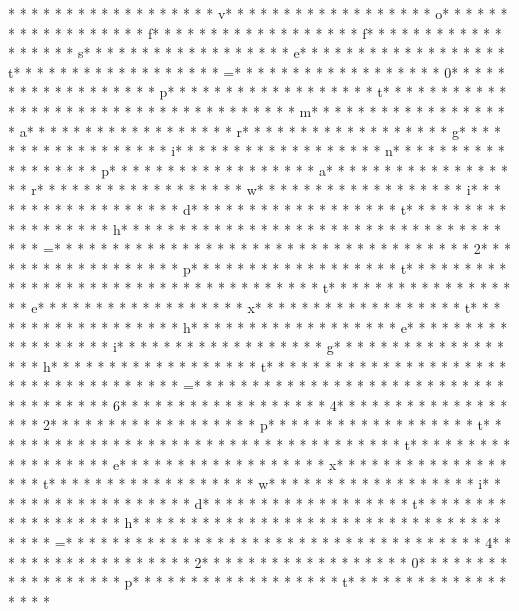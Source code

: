 * * *  * * *  * * *  *  * * *  *  * * *  * v* * *  * * *  * * *  *  * * *  *  * * *  * o* * *  * * *  * * *  *  * * *  *  * * *  * f* * *  * * *  * * *  *  * * *  *  * * *  * f* * *  * * *  * * *  *  * * *  *  * * *  * s* * *  * * *  * * *  *  * * *  *  * * *  * e* * *  * * *  * * *  *  * * *  *  * * *  * t* * *  * * *  * * *  *  * * *  *  * * *  * =* * *  * * *  * * *  *  * * *  *  * * *  * 0* * *  * * *  * * *  *  * * *  *  * * *  * p* * *  * * *  * * *  *  * * *  *  * * *  * t* * *  * * *  * * *  *  * * *  *  * * *  * 
* * *  * * *  * * *  *  * * *  *  * * *  * m* * *  * * *  * * *  *  * * *  *  * * *  * a* * *  * * *  * * *  *  * * *  *  * * *  * r* * *  * * *  * * *  *  * * *  *  * * *  * g* * *  * * *  * * *  *  * * *  *  * * *  * i* * *  * * *  * * *  *  * * *  *  * * *  * n* * *  * * *  * * *  *  * * *  *  * * *  * p* * *  * * *  * * *  *  * * *  *  * * *  * a* * *  * * *  * * *  *  * * *  *  * * *  * r* * *  * * *  * * *  *  * * *  *  * * *  * w* * *  * * *  * * *  *  * * *  *  * * *  * i* * *  * * *  * * *  *  * * *  *  * * *  * d* * *  * * *  * * *  *  * * *  *  * * *  * t* * *  * * *  * * *  *  * * *  *  * * *  * h* * *  * * *  * * *  *  * * *  *  * * *  *  * * *  * * *  * * *  *  * * *  *  * * *  * =* * *  * * *  * * *  *  * * *  *  * * *  *  * * *  * * *  * * *  *  * * *  *  * * *  * 2* * *  * * *  * * *  *  * * *  *  * * *  * p* * *  * * *  * * *  *  * * *  *  * * *  * t* * *  * * *  * * *  *  * * *  *  * * *  * 
* * *  * * *  * * *  *  * * *  *  * * *  * t* * *  * * *  * * *  *  * * *  *  * * *  * e* * *  * * *  * * *  *  * * *  *  * * *  * x* * *  * * *  * * *  *  * * *  *  * * *  * t* * *  * * *  * * *  *  * * *  *  * * *  * h* * *  * * *  * * *  *  * * *  *  * * *  * e* * *  * * *  * * *  *  * * *  *  * * *  * i* * *  * * *  * * *  *  * * *  *  * * *  * g* * *  * * *  * * *  *  * * *  *  * * *  * h* * *  * * *  * * *  *  * * *  *  * * *  * t* * *  * * *  * * *  *  * * *  *  * * *  *  * * *  * * *  * * *  *  * * *  *  * * *  * =* * *  * * *  * * *  *  * * *  *  * * *  *  * * *  * * *  * * *  *  * * *  *  * * *  * 6* * *  * * *  * * *  *  * * *  *  * * *  * 4* * *  * * *  * * *  *  * * *  *  * * *  * 2* * *  * * *  * * *  *  * * *  *  * * *  * p* * *  * * *  * * *  *  * * *  *  * * *  * t* * *  * * *  * * *  *  * * *  *  * * *  * 
* * *  * * *  * * *  *  * * *  *  * * *  * t* * *  * * *  * * *  *  * * *  *  * * *  * e* * *  * * *  * * *  *  * * *  *  * * *  * x* * *  * * *  * * *  *  * * *  *  * * *  * t* * *  * * *  * * *  *  * * *  *  * * *  * w* * *  * * *  * * *  *  * * *  *  * * *  * i* * *  * * *  * * *  *  * * *  *  * * *  * d* * *  * * *  * * *  *  * * *  *  * * *  * t* * *  * * *  * * *  *  * * *  *  * * *  * h* * *  * * *  * * *  *  * * *  *  * * *  *  * * *  * * *  * * *  *  * * *  *  * * *  * =* * *  * * *  * * *  *  * * *  *  * * *  *  * * *  * * *  * * *  *  * * *  *  * * *  * 4* * *  * * *  * * *  *  * * *  *  * * *  * 2* * *  * * *  * * *  *  * * *  *  * * *  * 0* * *  * * *  * * *  *  * * *  *  * * *  * p* * *  * * *  * * *  *  * * *  *  * * *  * t* * *  * * *  * * *  *  * * *  *  * * *  * 
